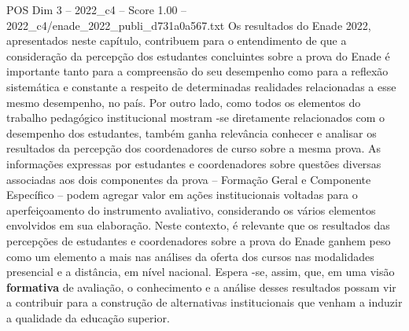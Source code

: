 \begin{textsample}{POS Dim 3 – 2022\_c4 – Score 1.00 – 2022\_c4/enade\_2022\_publi\_d731a0a567.txt}
Os resultados do Enade 2022, apresentados neste capítulo, contribuem para o entendimento de que a consideração da percepção dos estudantes concluintes sobre a prova do Enade é importante tanto para a compreensão do seu desempenho como para a reflexão sistemática e constante a respeito de determinadas realidades relacionadas a esse mesmo desempenho, no país.
Por outro lado, como todos os elementos do trabalho pedagógico institucional mostram -se diretamente relacionados com o desempenho dos estudantes, também ganha relevância conhecer e analisar os resultados da percepção dos coordenadores de curso sobre a mesma prova.
As informações expressas por estudantes e coordenadores sobre questões diversas associadas aos dois componentes da prova – Formação Geral e Componente Específico – podem agregar valor em ações institucionais voltadas para o aperfeiçoamento do instrumento avaliativo, considerando os vários elementos envolvidos em sua elaboração.
Neste contexto, é relevante que os resultados das percepções de estudantes e coordenadores sobre a prova do Enade ganhem peso como um elemento a mais nas análises da oferta dos cursos nas modalidades presencial e a distância, em nível nacional.
Espera -se, assim, que, em uma visão \textbf{formativa} de avaliação, o conhecimento e a análise desses resultados possam vir a contribuir para a construção de alternativas institucionais que venham a induzir a qualidade da educação superior.

\end{textsample}
